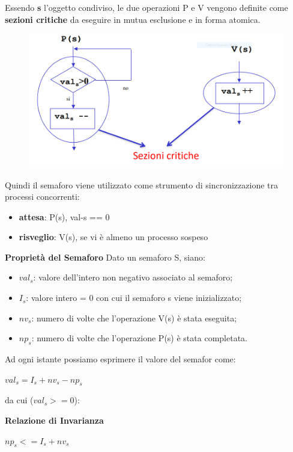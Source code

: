 \documentclass{article}
\begin{document}
Essendo \textbf{s} l'oggetto condiviso, le due operazioni P e V vengono definite come \textbf{sezioni critiche} da eseguire in mutua esclusione e in forma atomica.

\begin{figure}[htbp]
    \centering
    \includegraphics[width=0.50\columnwidth]{imgs/operazioni_semaforo.PNG}
\end{figure}

Quindi il semaforo viene utilizzato come strumento di sincronizzazione tra processi concorrenti:
\begin{itemize}
    \item \textbf{attesa}: P(s), val-s == 0
    \item \textbf{risveglio}: V(s), se vi è almeno un processo sospeso
\end{itemize}

\vspace{5mm}
\textbf{Proprietà del Semaforo}
\vspace{3mm}
Dato un semaforo S, siano:
\begin{itemize}
    \item \textbf{$val_s$}: valore dell'intero non negativo associato al semaforo;
    \item \textbf{$I_s$}: valore intero \>= 0 con cui il semaforo s viene inizializzato;
    \item \textbf{$nv_s$}: numero di volte che l'operazione V(s) è stata eseguita;
    \item \textbf{$np_s$}: numero di volte che l'operazione P(s) è stata completata.
\end{itemize}

\vspace{3mm}
Ad ogni istante possiamo esprimere il valore del semafor come:
\begin{center}
    $val_s = I_s + nv_s - np_s$
\end{center}

da cui ($val_s >= 0$):

\begin{center}
    \textbf{Relazione di Invarianza}

    \textbf{$np_s <= I_s + nv_s$}
\end{center}
\end{document}
